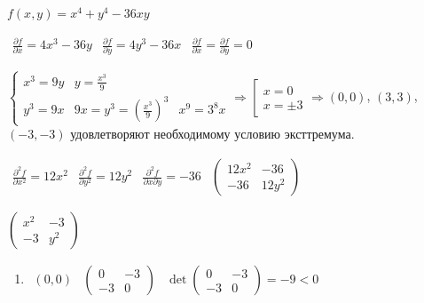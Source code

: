 \begin{example}
    $f(x, y)=x^4 + y^4 - 36xy$

    $\begin{array}{lll}
        \frac{\partial f}{\partial x}=4x^3 - 36y &  \frac{\partial f}{\partial y}=4y^3 - 36x & \frac{\partial f}{\partial x}=\frac{\partial f}{\partial y}=0
    \end{array}$

    $\left\{\begin{array}{lll}
         x^3=9y & y = \frac{x^3}{9} & \\
         y^3=9x & 9x=y^3=(\frac{x^3}{9})^3 & x^9=3^8x
    \end{array}\right.\Rightarrow \left[\begin{array}{l}
         x=0  \\
         x=\pm 3 
    \end{array}\right.\Rightarrow (0, 0)$, $(3, 3)$, $(-3, -3)$ удовлетворяют необходимому условию эксттремума.

    $\begin{array}{llll}
       \frac{\partial^2 f}{\partial x^2}=12x^2  & \frac{\partial^2 f}{\partial y^2}=12y^2 & \frac{\partial^2 f}{\partial x\partial y}=-36 &
       \begin{pmatrix}
           12x^2 & -36 \\
           -36 & 12y^2
       \end{pmatrix}
    \end{array}$

    $\begin{pmatrix}
           x^2 & -3 \\
           -3 & y^2
     \end{pmatrix}$

    \begin{enumerate}
        \item $\begin{array}{lll}
             (0, 0) & \begin{pmatrix}
                   0 & -3 \\
                   -3 & 0
             \end{pmatrix} & 
             \det \begin{pmatrix}
                   0 & -3 \\
                   -3 & 0
             \end{pmatrix} = -9 < 0
                \end{array}$
                

\end{enumerate}
\end{example}
